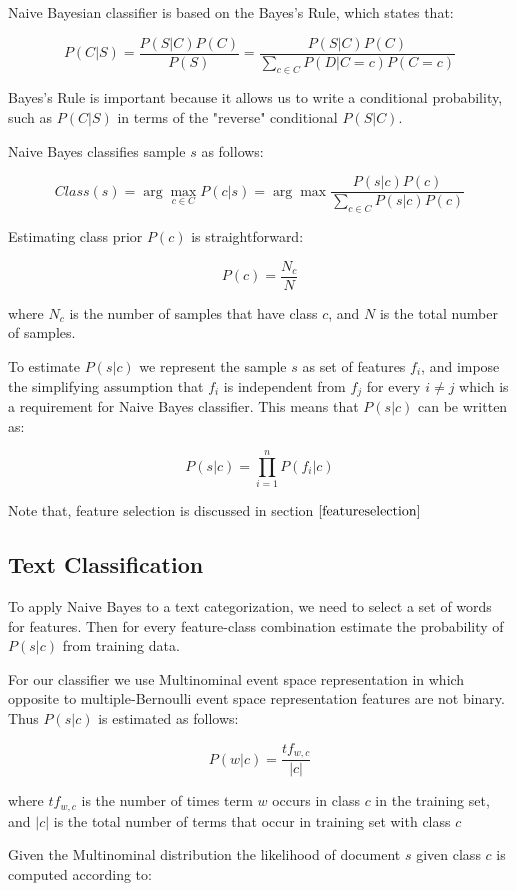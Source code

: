 \documentclass{report}
\begin{document}
Naive Bayesian classifier is based on the Bayes's Rule, which states that:

\[
P(C|S) = \frac{P (S|C) P (C)}{P(S)} = \frac{P (S|C) P (C)}{\sum_{c \in C} P(D|C=c)P(C=c)}
\]

Bayes's Rule is important because it allows us to write a conditional probability, such as $P(C|S)$ in terms of the "reverse" conditional 
$P(S|C)$.

Naive Bayes classifies sample $s$ as follows:

\[
Class(s)  = \arg \max_{c \in C} P(c|s) = \arg \max \frac{P(s|c)P(c)}{\sum_{c \in C} P(s|c)P(c)}
\]

Estimating class prior $P(c)$ is straightforward:

\[
P(c) = \frac{N_c}{N}
\]

where $N_c$ is the number of samples that have class $c$, and $N$ is the total number of samples.

To estimate $P(s|c)$ we represent the sample $s$ as set of features $f_i$, and impose the simplifying assumption that $f_i$ is independent from $f_j$  for every $i \neq j$ which is a requirement for Naive Bayes classifier. This means that $P(s|c)$ can be written as:

\[
P(s|c) = \prod_{i=1}^n P(f_i|c)
\]

Note that, feature selection is discussed in section  $\ref{featureselection}$

\subsection{Text Classification}

To apply Naive Bayes to a text categorization, we need to select a set of words for features. Then for every feature-class combination estimate the probability of $P(s|c)$ from training data.

For our classifier we use Multinominal event space representation in which opposite to multiple-Bernoulli event space representation features are not binary\cite{Croft:2010:SEI}. Thus $P(s|c)$ is estimated as follows:

\[
P(w|c) = \frac{tf_{w,c}}{|c|}
\]

where $tf_{w,c}$ is the number of times term $w$ occurs in class $c$ in the training set, and $|c|$ is the total number of terms that occur in training set with class $c$

Given the Multinominal distribution the likelihood of document $s$ given class $c$ is computed according to:
\end{document}

